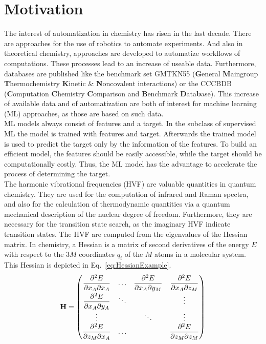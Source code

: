 \chapter{Motivation}
The interest of automatization in chemistry has risen in the last decade. There are approaches for the use of robotics to automate experiments.\supercite{Gesmundo2018Robotics,Li2018Robotics}
And also in theoretical chemistry, approaches are developed to automatize workflows of computations.\supercite{Schmitz2021}
These processes lead to an increase of useable data.
Furthermore, databases are published like the benchmark set GMTKN55 (\textbf{G}eneral \textbf{M}aingroup \textbf{T}hermochemistry \textbf{K}inetic \& \textbf{N}oncovalent interactions)\supercite{Goerigk2017}
or the CCCBDB (\textbf{C}omputation \textbf{C}hemistry \textbf{C}omparison and \textbf{B}enchmark \textbf{D}ata\textbf{b}ase)\supercite{CCCBDB}. 
This increase of available data and of automatization are both of interest for machine learning (ML) approaches, as those are based on such data.\\
ML models always consist of features and a target.
In the subclass of supervised ML the model is trained with features and target. 
Afterwards the trained model is used to predict the target only by the information of the features.
To build an efficient model, the features should be easily accessible, while the target should be computationally costly.
Thus, the ML model has the advantage to accelerate the process of determining the target.\\
The harmonic vibrational frequencies (HVF) are valuable quantities in quantum chemistry.
They are used for the computation of infrared\supercite{Katari2017} and Raman spectra\supercite{Michalska2005}, and also for the calculation of thermodynamic quantities via a quantum mechanical description of the nuclear degree of freedom\supercite{Neto2017}.
Furthermore, they are necessary for the transition state search, as the imaginary HVF indicate transition states.\supercite{delCampo2008}
The HVF are computed from the eigenvalues of the Hessian matrix. 
In chemistry, a Hessian is a matrix of second derivatives of the energy $E$ with respect to the $3M$ coordinates $q_i$ of the $M$ atoms in a molecular system.\supercite{Jensen2013}
This Hessian is depicted in Eq.~\eqref{eq:HessianExample}.
\begin{align}
    \label{eq:HessianExample}
    \textbf{H} =
    \left(\begin{matrix}
        \dfrac{\partial^2 E}{\partial x_A \partial x_A} & \hdotsfor{1} & \dfrac{\partial^2 E}{\partial x_A \partial y_M} &
        \dfrac{\partial^2 E}{\partial x_A \partial z_M} \vspace*{2pt} \\
        \dfrac{\partial^2 E}{\partial x_A \partial y_A} & \ddots & & \vdots \\
        \vdots & & \ddots & \vdots \\
        \dfrac{\partial^2 E}{\partial z_M \partial x_A}  & \hdotsfor{0} & & \dfrac{\partial^2 E}{\partial z_M \partial z_M} 
    \end{matrix}\right)
\end{align}
